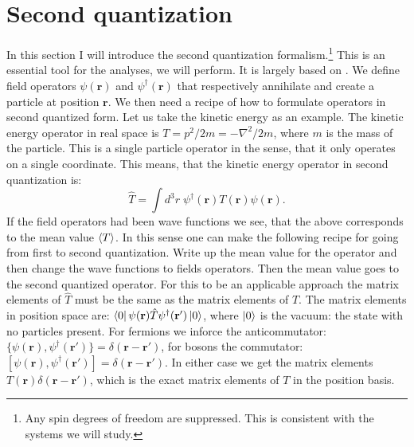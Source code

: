\section{Second quantization} \label{sec.secondquantization}
In this section I will introduce the second quantization formalism.\footnote{Any spin degrees of freedom are suppressed. This is consistent with the systems we will study.} This is an essential tool for the analyses, we will perform. It is largely based on \cite[pp. 221-227]{LandauQM}. We define field operators $\psi(\mathbf{r})$ and $\psi^\dagger(\mathbf{r})$ that respectively annihilate and create a particle at position $\mathbf{r}$. We then need a recipe of how to formulate operators in second quantized form. Let us take the kinetic energy as an example. The kinetic energy operator in real space is $T = p^2/2m = -\nabla^2/2m$, where $m$ is the mass of the particle. This is a single particle operator in the sense, that it only operates on a single coordinate. This means, that the kinetic energy operator in second quantization is:
\begin{equation}
\hat{T} = \int d^3 r \; \psi^\dagger(\mathbf{r}) T(\mathbf{r})\psi(\mathbf{r}). \nonumber   
\end{equation} 
If the field operators had been wave functions we see, that the above corresponds to the mean value $\braket{T}$. In this sense one can make the following recipe for going from first to second quantization. Write up the mean value for the operator and then change the wave functions to fields operators. Then the mean value goes to the second quantized operator. For this to be an applicable approach the matrix elements of $\hat{T}$ must be the same as the matrix elements of $T$. The matrix elements in position space are: $\bra{0}\psi(\mathbf{r}) \hat{T} \psi^\dagger(\mathbf{r}')\ket{0}$, where $\ket{0}$ is the vacuum: the state with no particles present. For fermions we inforce the anticommutator: $\{\psi(\mathbf{r}), \psi^\dagger(\mathbf{r}')\} = \delta(\mathbf{r}-\mathbf{r}')$, for bosons the commutator: $[\psi(\mathbf{r}), \psi^\dagger(\mathbf{r}')] = \delta(\mathbf{r}-\mathbf{r}')$. In either case we get the matrix elements $T(\mathbf{r})\delta(\mathbf{r}-\mathbf{r}')$, which is the exact matrix elements of $T$ in the position basis. 

